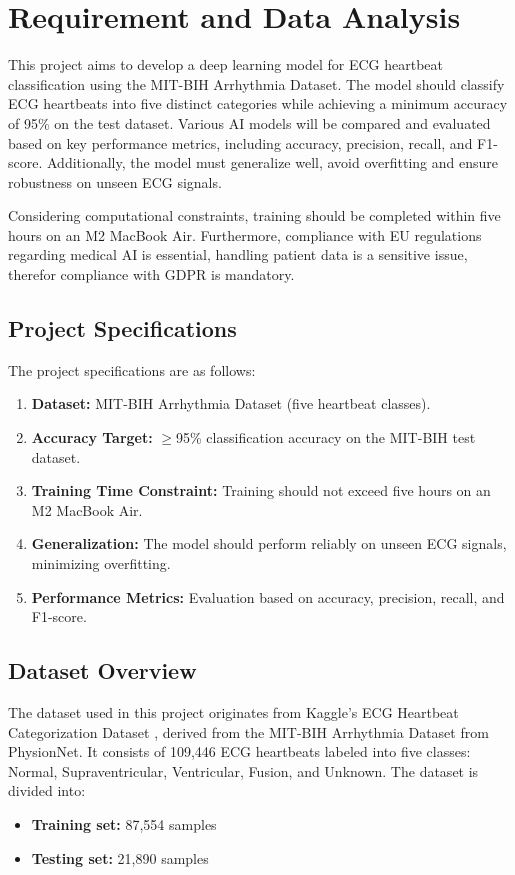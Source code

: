 \section{Requirement and Data Analysis}
This project aims to develop a deep learning model for ECG heartbeat classification using the MIT-BIH Arrhythmia Dataset. The model should classify ECG heartbeats into five distinct categories while achieving a minimum accuracy of 95\% on the test dataset. Various AI models will be compared and evaluated based on key performance metrics, including accuracy, precision, recall, and F1-score. Additionally, the model must generalize well, avoid overfitting and ensure robustness on unseen ECG signals.

Considering computational constraints, training should be completed within five hours on an M2 MacBook Air. Furthermore, compliance with EU regulations regarding medical AI is essential, handling patient data is a sensitive issue, therefor compliance with GDPR is mandatory.

\subsection{Project Specifications}\label{sec:project-specs}
The project specifications are as follows:
\begin{enumerate}
    \item \textbf{Dataset:} MIT-BIH Arrhythmia Dataset (five heartbeat classes).
    \item \textbf{Accuracy Target:} $\geq$95\% classification accuracy on the MIT-BIH test dataset.
    \item \textbf{Training Time Constraint:} Training should not exceed five hours on an M2 MacBook Air.
    \item \textbf{Generalization:} The model should perform reliably on unseen ECG signals, minimizing overfitting.
    \item \textbf{Performance Metrics:} Evaluation based on accuracy, precision, recall, and F1-score.
\end{enumerate}

\subsection{Dataset Overview}
The dataset used in this project originates from Kaggle's ECG Heartbeat Categorization Dataset \cite{b1}, derived from the MIT-BIH Arrhythmia Dataset from PhysionNet. It consists of 109,446 ECG heartbeats labeled into five classes: Normal, Supraventricular, Ventricular, Fusion, and Unknown. The dataset is divided into:
\begin{itemize}
    \item \textbf{Training set:} 87,554 samples
    \item \textbf{Testing set:} 21,890 samples
\end{itemize}

